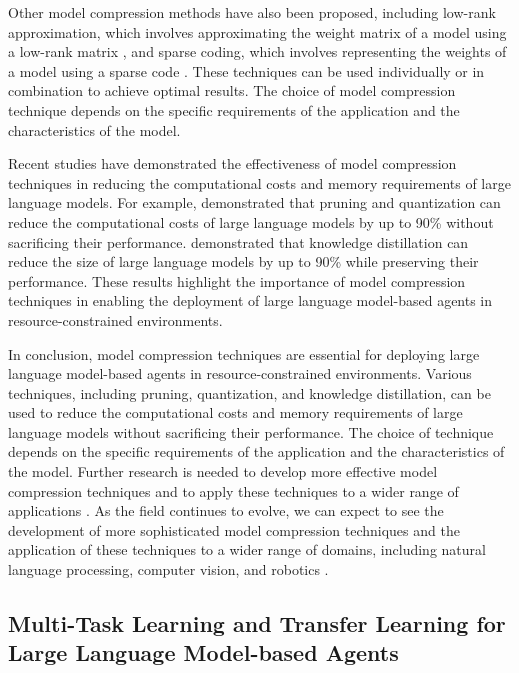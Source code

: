 \documentclass[11pt,a4paper]{article}
\begin{document}
Other model compression methods have also been proposed, including low-rank approximation, which involves approximating the weight matrix of a model using a low-rank matrix \cite{arxiv:2402.06196}, and sparse coding, which involves representing the weights of a model using a sparse code \cite{doi:10.3390/app14052074}. These techniques can be used individually or in combination to achieve optimal results. The choice of model compression technique depends on the specific requirements of the application and the characteristics of the model.

Recent studies have demonstrated the effectiveness of model compression techniques in reducing the computational costs and memory requirements of large language models. For example, \cite{arxiv:2112.11446} demonstrated that pruning and quantization can reduce the computational costs of large language models by up to 90\% without sacrificing their performance. \cite{doi:10.18653/v1/2022.bigscience-1.1} demonstrated that knowledge distillation can reduce the size of large language models by up to 90\% while preserving their performance. These results highlight the importance of model compression techniques in enabling the deployment of large language model-based agents in resource-constrained environments.

In conclusion, model compression techniques are essential for deploying large language model-based agents in resource-constrained environments. Various techniques, including pruning, quantization, and knowledge distillation, can be used to reduce the computational costs and memory requirements of large language models without sacrificing their performance. The choice of technique depends on the specific requirements of the application and the characteristics of the model. Further research is needed to develop more effective model compression techniques and to apply these techniques to a wider range of applications \cite{arxiv:2401.02777}. As the field continues to evolve, we can expect to see the development of more sophisticated model compression techniques and the application of these techniques to a wider range of domains, including natural language processing, computer vision, and robotics \cite{doi:10.1145/3748302}.


\subsection{Multi-Task Learning and Transfer Learning for Large Language Model-based Agents}
\end{document}
